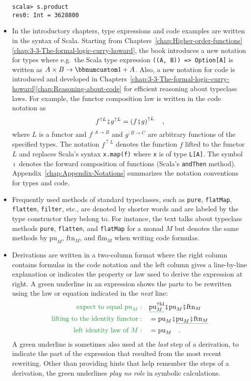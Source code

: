 \begin{itemize}
\begin{lstlisting}[mathescape=true]
scala> s.product
res0: Int = 3628800 
\end{lstlisting}
\item In the introductory chapters, type expressions and code examples are
written in the syntax of Scala. Starting from Chapters~\ref{chap:Higher-order-functions}\textendash \ref{chap:3-3-The-formal-logic-curry-howard},
the book introduces a new notation for types where e.g.~the Scala
type expression \lstinline!((A, B)) => Option[A]! is written as $A\times B\rightarrow\bbnum 1+A$.
Also, a new notation for code is introduced and developed in Chapters~\ref{chap:3-3-The-formal-logic-curry-howard}\textendash \ref{chap:Reasoning-about-code}
for efficient reasoning about typeclass laws. For example, the functor
composition law is written in the code notation as
\[
f^{\uparrow L}\bef g^{\uparrow L}=\left(f\bef g\right)^{\uparrow L}\quad,
\]
where $L$ is a functor and $f^{:A\rightarrow B}$ and $g^{:B\rightarrow C}$
are arbitrary functions of the specified types. The notation $f^{\uparrow L}$
denotes the function $f$ lifted to the functor $L$ and replaces
Scala's syntax \lstinline!x.map(f)! where \lstinline!x! is of type
\lstinline!L[A]!. The symbol $\bef$ denotes the forward composition
of functions (Scala's \lstinline!andThen! method). Appendix~\ref{chap:Appendix-Notations}
summarizes the notation conventions for types and code.
\item Frequently used methods of standard typeclasses, such as \lstinline!pure!,
\lstinline!flatMap!, \lstinline!flatten!, \lstinline!filter!, etc.,
are denoted by shorter words and are labeled by the type constructor
they belong to. For instance, the text talks about typeclass methods
\lstinline!pure!, \lstinline!flatten!, and \lstinline!flatMap!
for a monad $M$ but denotes the same methods by $\text{pu}_{M}$,
$\text{ftn}_{M}$, and $\text{flm}_{M}$ when writing code formulas.
\item Derivations are written in a two-column format where the right column
contains formulas in the code notation and the left column gives a
line-by-line explanation or indicates the property or law used to
derive the expression at right. A green underline in an expression
shows the parts to be rewritten using the law or equation indicated
in the \emph{next} line:
\begin{align*}
{\color{greenunder}\text{expect to equal }\text{pu}_{M}:}\quad & \gunderline{\text{pu}_{M}^{\uparrow\text{Id}}}\bef\text{pu}_{M}\bef\text{ftn}_{M}\\
{\color{greenunder}\text{lifting to the identity functor}:}\quad & =\text{pu}_{M}\bef\gunderline{\text{pu}_{M}\bef\text{ftn}_{M}}\\
{\color{greenunder}\text{left identity law of }M:}\quad & =\text{pu}_{M}\quad.
\end{align*}
A green underline is sometimes also used at the \emph{last} step of
a derivation, to indicate the part of the expression that resulted
from the most recent rewriting. Other than providing hints that help
remember the steps of a derivation, the green underlines \emph{play
no role} in symbolic calculations.
\end{itemize}

